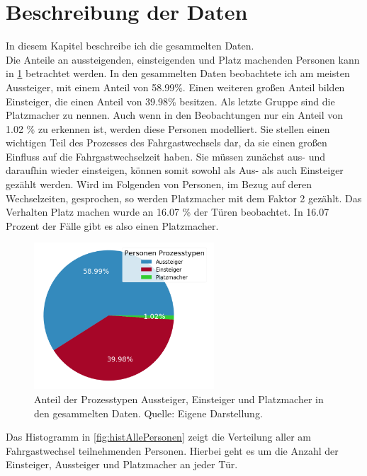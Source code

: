 \section{Beschreibung der Daten} \label{Beschreibung der Daten}
In diesem Kapitel beschreibe ich die gesammelten Daten.\\
Die Anteile an aussteigenden, einsteigenden und Platz machenden Personen kann in \figurename \ref{fig:AnteileProzesstypen} betrachtet werden. In den gesammelten Daten beobachtete ich am meisten Aussteiger, mit einem Anteil von 58.99\%. Einen weiteren großen Anteil bilden Einsteiger, die einen Anteil von 39.98\% besitzen. Als letzte Gruppe sind die Platzmacher zu nennen. Auch wenn in den Beobachtungen nur ein Anteil von 1.02 \% zu erkennen ist, werden diese Personen modelliert. Sie stellen einen wichtigen Teil des Prozesses des Fahrgastwechsels dar, da sie einen großen Einfluss auf die Fahrgastwechselzeit haben. Sie müssen zunächst aus- und daraufhin wieder einsteigen, können somit sowohl als Aus- als auch Einsteiger gezählt werden. Wird im Folgenden von Personen, im Bezug auf deren Wechselzeiten, gesprochen, so werden Platzmacher mit dem Faktor 2 gezählt. Das Verhalten Platz machen wurde an 16.07 \% der Türen beobachtet. In 16.07 Prozent der Fälle gibt es also einen Platzmacher.
\begin{figure}[H]
	\centering
		\includegraphics[width=0.6\textwidth]{pictures/data_evaluation/data_description/process_types.png}
	\caption{Anteil der Prozesstypen Aussteiger, Einsteiger und Platzmacher in den gesammelten Daten.  Quelle: Eigene Darstellung.}
	\label{fig:AnteileProzesstypen}
\end{figure}
Das Histogramm in \figurename\ref{fig:histAllePersonen} zeigt die Verteilung aller am Fahrgastwechsel teilnehmenden Personen. Hierbei geht es um die Anzahl der Einsteiger, Aussteiger und Platzmacher an jeder Tür.
